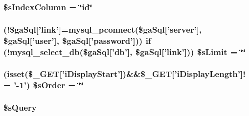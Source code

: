 \hypertarget{objects__jsonp_8php_a8bddf0b8ded9777b9068de5fa9e217a2}{
\subsubsection[{\$s\+Index\+Column}]{\setlength{\rightskip}{0pt plus 5cm}\$s\+Index\+Column = \char`\"{}id\char`\"{}}}\label{objects__jsonp_8php_a8bddf0b8ded9777b9068de5fa9e217a2}
\hypertarget{objects__jsonp_8php_a867f070c3b4e597275c622aac60de587}{
\subsubsection[{\$s\+Limit}]{ (!\$ga\+Sql\mbox{[}'link'\mbox{]}=mysql\+\_\+pconnect(\$ga\+Sql\mbox{[}'server'\mbox{]}, \$ga\+Sql\mbox{[}'user'\mbox{]}, \$ga\+Sql\mbox{[}'password'\mbox{]})) {\bf if} (!mysql\+\_\+select\+\_\+db(\$ga\+Sql\mbox{[}'db'\mbox{]}, \$ga\+Sql\mbox{[}'link'\mbox{]})) \$s\+Limit = \char`\"{}\char`\"{}}}\label{objects__jsonp_8php_a867f070c3b4e597275c622aac60de587}
\hypertarget{objects__jsonp_8php_a4943002271f61f76fd87176bc8b923bf}{
\subsubsection[{\$s\+Order}]{ (isset(\$\+\_\+\+G\+E\+T\mbox{[}'i\+Display\+Start'\mbox{]})\&\&\$\+\_\+\+G\+E\+T\mbox{[}'i\+Display\+Length'\mbox{]}!= '-\/1') \$s\+Order = \char`\"{}\char`\"{}}}\label{objects__jsonp_8php_a4943002271f61f76fd87176bc8b923bf}
\hypertarget{objects__jsonp_8php_a5175d5486118502db3f7aa1ccf7029cc}{
\subsubsection[{\$s\+Query}]{\setlength{\rightskip}{0pt plus 5cm}\$s\+Query}}\label{objects__jsonp_8php_a5175d5486118502db3f7aa1ccf7029cc}

